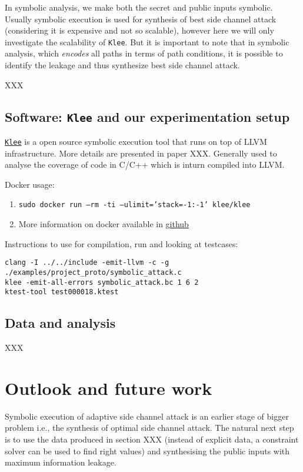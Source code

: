 \documentclass[11pt,a4paper,notitlepage]{article}
\begin{document}
In symbolic analysis, we make both the secret and public inputs symbolic.
Usually symbolic execution is used for synthesis of best side channel attack (considering it is expensive and not so scalable), however here we will only investigate the scalability of \texttt{Klee}.
But it is important to note that in symbolic analysis, which \emph{encodes} all paths in terms of path conditions, it is possible to identify the leakage and thus synthesize best side channel attack.

XXX

\subsection{Software: \texttt{Klee} and our experimentation setup}
\label{subsec:softwares}

\href{https://klee.github.io/}{\texttt{Klee}} is a open source symbolic execution tool that runs on top of LLVM infrastructure.
More details are presented in paper XXX.
Generally used to analyse the coverage of code in C/C++ which is inturn compiled into LLVM. 

Docker usage:
\begin{enumerate}
    \item \texttt{sudo docker run --rm -ti --ulimit='stack=-1:-1' klee/klee}
    \item More information on docker available in \href{http://klee.github.io/releases/docs/v1.3.0/docker/}{github}
\end{enumerate}

Instructions to use for compilation, run and looking at testcases:
\begin{verbatim}
clang -I ../../include -emit-llvm -c -g ./examples/project_proto/symbolic_attack.c
klee -emit-all-errors symbolic_attack.bc 1 6 2
ktest-tool test000018.ktest
\end{verbatim}


\subsection{Data and analysis}
\label{subsec:dataandanalysis}

XXX

\newpage

\section{Outlook and future work}
\label{sec:futurework}

Symbolic execution of adaptive side channel attack is an earlier stage of bigger problem i.e., the synthesis of optimal side channel attack.
The natural next step is to use the data produced in section XXX (instead of explicit data, a constraint solver can be used to find right values) and synthesising the public inputs with maximum information leakage.
\end{document}
